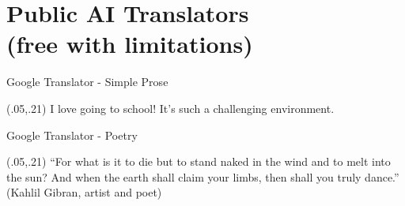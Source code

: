 \documentclass{beamer}
\begin{document}
\section{Public AI Translators\\
(free with limitations)}

\begin{frame}{Google Translator - Simple Prose}

\begin{textblock}{1}(.05,.21)
  \normalsize {I love going to school! It's such a challenging environment.}
\end{textblock}


\end{frame}

\begin{frame} {Google Translator - Poetry}
\begin{textblock}{1}(.05,.21)
  \normalsize {\enquote{For what is it to die but to stand naked in the wind and to melt into the sun? And when the earth shall claim your limbs, then shall you truly dance.} (Kahlil Gibran, artist and poet)}
\end{textblock}


\end{frame}
\end{document}
